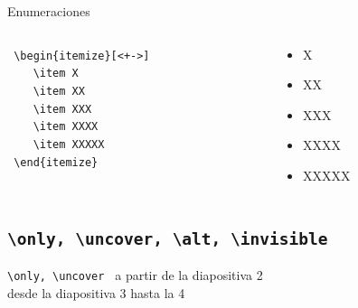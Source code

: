\documentclass[dvipsnames,xcolor=x11names]{beamer}
\theoremstyle{plain}
\theoremstyle{definition}
\begin{document}
\begin{frame}[fragile]{Enumeraciones}

   \begin{columns}
      \begin{column}{.5\textwidth}
	 \verb! \begin{itemize}!{\color{red}\verb![<+->]!}\\
	 \verb+    \item X +\\
	 \verb+    \item XX +\\
	 \verb+    \item XXX +\\
	 \verb+    \item XXXX +\\
	 \verb+    \item XXXXX +\\
	 \verb+ \end{itemize} +\\
      \end{column}
      \begin{column}{.5\textwidth}
      \begin{itemize}[<+->]
	 \item X 
	 \item XX
	 \item XXX
	 \item XXXX
	 \item XXXXX 
      \end{itemize}
      \end{column}
   \end{columns}
   \bigskip

\end{frame}

\subsection{\texttt{\textbackslash only, \textbackslash uncover, \textbackslash alt, \textbackslash invisible }}
\begin{frame}{\texttt{\textbackslash only, \textbackslash uncover }}
   {a partir de la diapositiva 2\\}
   {desde la diapositiva 3 hasta la 4\\}
\end{frame}
\end{document}
